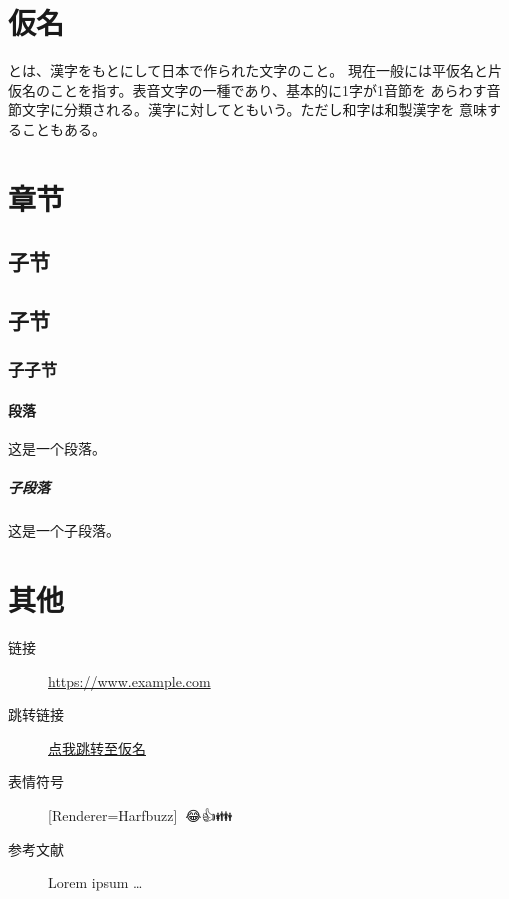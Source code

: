 \documentclass[
  fontset = none,
  punct   = kaiming,
]{ctexart}
\newcommand{\emoji}[1]{
  {\setmainfont{Apple Color Emoji}[Renderer=Harfbuzz]{#1}}
}
\renewcommand{\emph}[1]{\textbf{#1}}
\newcommand{\upcite}[1]{\textsuperscript{\cite{#1}}}
\begin{document}
\newpage
\gothic
\section{仮名} \label{sec:kana}

\emph{}とは、漢字をもとにして日本で作られた文字のこと。
現在一般には平仮名と片仮名のことを指す。表音文字の一種であり、基本的に1字が1音節を
あらわす音節文字に分類される。漢字に対してともいう。ただし和字は和製漢字を
意味することもある。

\newpage
\sans
\section{章节}

\subsection{子节}
\subsection{子节}
\subsubsection{子子节}

\paragraph{段落} 这是一个段落。
\subparagraph{子段落} 这是一个子段落。


\newpage
\section{其他}

\sans

\begin{description}
  \item[链接] \url{https://www.example.com}
  \item[跳转链接]
    \hyperref[sec:kana]{点我跳转至{\gothic{}仮名}}
  \item[表情符号] \emoji{😶‍🌫️😂👍👪}
  \item[参考文献] Lorem ipsum \ldots \upcite{greenwade93}
\end{description}


\end{document}
